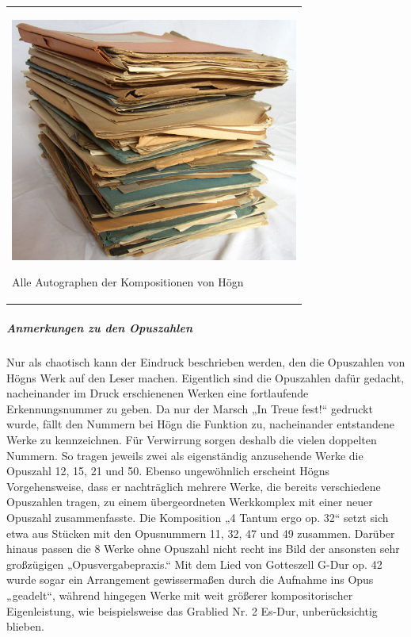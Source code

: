 \begin{center}
\tablefirsthead{}
\tablehead{}
\tabletail{}
\tablelasttail{}
\begin{supertabular}{m{9.701cm}}

\includegraphics[width=9.491cm,height=8.017cm]{pictures/zulassungsarbeit-img059.jpg}

Alle Autographen der Kompositionen von
Högn\\
\end{supertabular}
\end{center}
\clearpage\subparagraph{Anmerkungen zu den Opuszahlen}
Nur als chaotisch kann der Eindruck beschrieben werden, den die
Opuszahlen von Högns Werk auf den Leser machen. Eigentlich sind die
Opuszahlen dafür gedacht, nacheinander im Druck erschienenen Werken
eine fortlaufende Erkennungsnummer zu geben. Da nur der Marsch „In
Treue fest!“ gedruckt wurde, fällt den Nummern bei Högn die Funktion
zu, nacheinander entstandene Werke zu kennzeichnen. Für Verwirrung
sorgen deshalb die vielen doppelten Nummern. So tragen jeweils zwei als
eigenständig anzusehende Werke die Opuszahl 12, 15, 21 und 50. Ebenso
ungewöhnlich erscheint Högns Vorgehensweise, dass er nachträglich
mehrere Werke, die bereits verschiedene Opuszahlen tragen, zu einem
übergeordneten Werkkomplex mit einer neuer Opuszahl zusammenfasste. Die
Komposition „4 Tantum ergo op. 32“ setzt sich etwa aus Stücken mit den
Opusnummern 11, 32, 47 und 49 zusammen. Darüber hinaus passen die 8
Werke ohne Opuszahl nicht recht ins Bild der ansonsten sehr großzügigen
„Opusvergabepraxis.“ Mit dem Lied von Gotteszell G-Dur op. 42 wurde
sogar ein Arrangement gewissermaßen durch die Aufnahme ins Opus
„geadelt“, während hingegen Werke mit weit größerer kompositorischer
Eigenleistung, wie beispielsweise das Grablied Nr. 2 Es-Dur,
unberücksichtig blieben.

